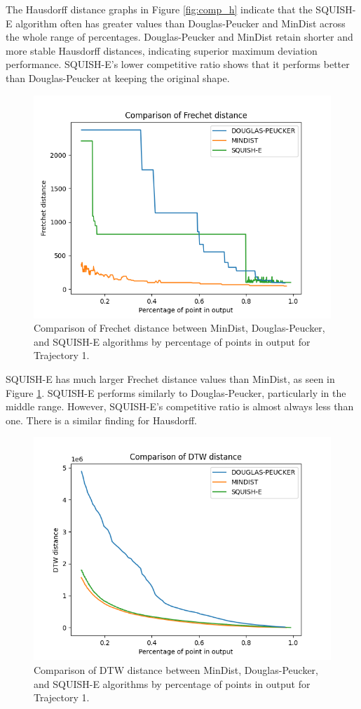 The Hausdorff distance graphs in Figure \ref{fig:comp_h} indicate that the SQUISH-E algorithm often has greater values than Douglas-Peucker and MinDist across the whole range of percentages. Douglas-Peucker and MinDist retain shorter and more stable Hausdorff distances, indicating superior maximum deviation performance. SQUISH-E's lower competitive ratio shows that it performs better than Douglas-Peucker at keeping the original shape.

\begin{figure}
	\centering
	\includegraphics[width=0.9\linewidth]{figures/Stats/fretchet_comp.png}
	\caption{Comparison of Frechet distance between MinDist, Douglas-Peucker, and SQUISH-E algorithms by percentage of points in output for Trajectory 1.}
	\label{fig:comp_f}
\end{figure}

SQUISH-E has much larger Frechet distance values than MinDist, as seen in Figure \ref{fig:comp_f}. SQUISH-E performs similarly to Douglas-Peucker, particularly in the middle range. However, SQUISH-E's competitive ratio is almost always less than one. There is a similar finding for Hausdorff.



\begin{figure}
	\centering
	\includegraphics[width=0.9\linewidth]{figures/Stats/dtimewarp_comp.png}
	\caption{Comparison of DTW distance between MinDist, Douglas-Peucker, and SQUISH-E algorithms by percentage of points in output for Trajectory 1.}
	\label{fig:comp_dt}
\end{figure}

